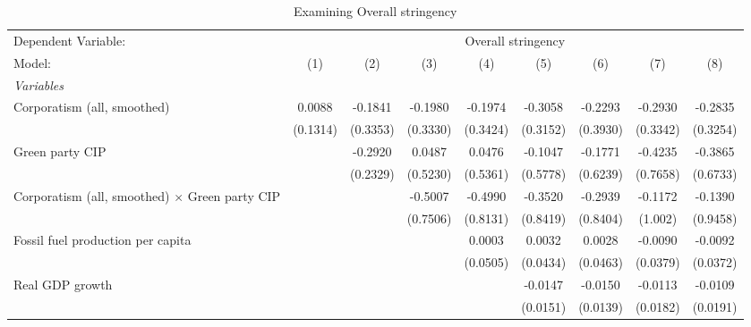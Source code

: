 
\begin{table}[htbp]
   \caption{Examining Overall stringency}
   \centering
   \begin{tabular}{lcccccccc}
      \tabularnewline \midrule \midrule
      Dependent Variable: & \multicolumn{8}{c}{Overall stringency}\\
      Model:                                                & (1)                   & (2)      & (3)      & (4)      & (5)      & (6)      & (7)      & (8)\\  
      \midrule
      \emph{Variables}\\
      Corporatism (all, smoothed)                           & 0.0088                & -0.1841  & -0.1980  & -0.1974  & -0.3058  & -0.2293  & -0.2930  & -0.2835\\   
                                                            & (0.1314)              & (0.3353) & (0.3330) & (0.3424) & (0.3152) & (0.3930) & (0.3342) & (0.3254)\\   
      Green party CIP                                       &                       & -0.2920  & 0.0487   & 0.0476   & -0.1047  & -0.1771  & -0.4235  & -0.3865\\   
                                                            &                       & (0.2329) & (0.5230) & (0.5361) & (0.5778) & (0.6239) & (0.7658) & (0.6733)\\   
      Corporatism (all, smoothed) $\times$ Green party CIP  &                       &          & -0.5007  & -0.4990  & -0.3520  & -0.2939  & -0.1172  & -0.1390\\   
                                                            &                       &          & (0.7506) & (0.8131) & (0.8419) & (0.8404) & (1.002)  & (0.9458)\\   
      Fossil fuel production per capita                     &                       &          &          & 0.0003   & 0.0032   & 0.0028   & -0.0090  & -0.0092\\   
                                                            &                       &          &          & (0.0505) & (0.0434) & (0.0463) & (0.0379) & (0.0372)\\   
      Real GDP growth                                       &                       &          &          &          & -0.0147  & -0.0150  & -0.0113  & -0.0109\\   
                                                            &                       &          &          &          & (0.0151) & (0.0139) & (0.0182) & (0.0191)\\   

\end{tabular}
\end{table}
